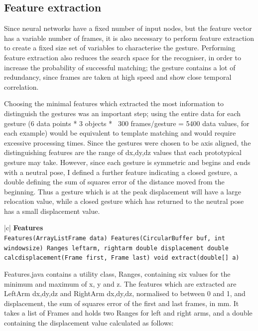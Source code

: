 \documentclass[12pt,a4,notitlepage]{report}
\renewcommand{\_}{\texttt{\symbol{95}}}
\newcommand{\<}{\texttt{\symbol{60}}}
\renewcommand{\>}{\texttt{\symbol{62}}}
\newcommand{\class}[1]{\textbf{#1}}
\newcommand{\variable}[1]{\texttt{#1}}
\begin{document}
\subsection{Feature extraction}

Since neural networks have a fixed number of input nodes, but the feature vector has a variable number of frames, it is also necessary to perform feature extraction to create a fixed size set of variables to characterise the gesture. Performing feature extraction also reduces the search space for the recogniser, in order to increase the probability of successful matching; the gesture contains a lot of redundancy, since frames are taken at high speed and show close temporal correlation.

Choosing the minimal features which extracted the most information to distinguish the gestures was an important step; using the entire data for each gesture (6 data points * 3 objects * ~300 frames/gesture = 5400 data values, for each example) would be equivalent to template matching and would require excessive processing times. Since the gestures were chosen to be axis aligned, the distinguishing features are the range of dx,dy,dz values that each prototypical gesture may take. However, since each gesture is symmetric and begins and ends with a neutral pose, I defined a further feature indicating a closed gesture, a double defining the sum of squares error of the distance moved from the beginning. Thus a gesture which is at the peak displacement will have a large relocation value, while a closed gesture which has returned to the neutral pose has a small displacement value.

\begin{tabular}{|c|} \hline 
\class{Features} \\ \hline
{}
{\variable{Features(ArrayList\<Frame\> data) \newline
Features(CircularBuffer buf, int windowsize) \newline
Ranges leftarm, rightarm \newline
double displacement \newline
double calc\_displacement(Frame first, Frame last) \newline
void extract(double[] a)
} } \\ \hline
\end{tabular}

Features.java contains a utility class, Ranges, containing six values for the minimum and maximum of x, y and z. The features which are extracted are LeftArm {dx,dy,dz} and RightArm {dx,dy,dz}, normalised to between 0 and 1, and displacement, the sum of squares error of the first and last frames, in mm. It takes a list of Frames and holds two Ranges for left and right arms, and a double containing the displacement value calculated as follows:
\end{document}
